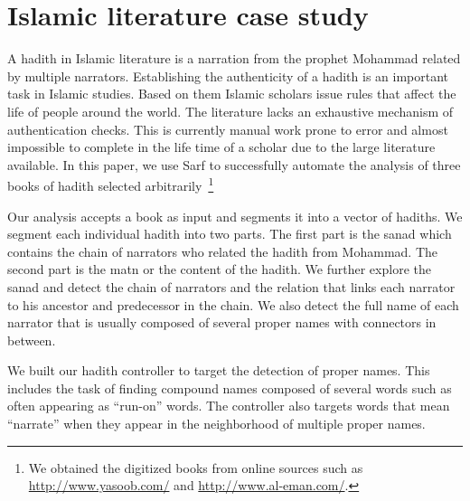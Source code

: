 \documentclass[11pt]{article}
\begin{document}
\section{Islamic literature case study}
\label{sec:islamic}

A hadith in Islamic literature is a narration from the prophet Mohammad
related by multiple narrators.
Establishing the authenticity of a hadith is an important task
in Islamic studies. 
Based on them Islamic scholars issue rules that affect the life
of people around the world. 
The literature lacks an exhaustive mechanism of authentication
checks. This is currently manual work prone to error and almost
impossible to complete in the life time of a scholar due to the
large literature available. 
In this paper, we use Sarf to successfully automate the
analysis of three books of hadith selected 
arbitrarily~\cite{IbnHanbal,AlKulayni,AlTousi}\footnote{We obtained
  the digitized books from online sources such as 
  \href{http://www.yasoob.com/}{http://www.yasoob.com/} and 
  \href{http://www.al-eman.com/}{http://www.al-eman.com/}. }



Our analysis accepts a book as input
and segments it into a vector of hadiths. 
We segment each individual hadith into two parts. 
The first part is the sanad which
contains the chain of narrators who related the hadith
from Mohammad. 
The second part is the matn or the content
of the hadith. 
We further explore the sanad and
detect the chain of narrators and 
the relation that links each narrator to his ancestor and 
predecessor in the chain. 
We also detect the full name of each narrator that is
usually composed of several proper names with connectors
in between. 

We built our hadith controller to target
the detection of proper names. 
This includes the task of finding compound names 
composed of several words such as  often
appearing as ``run-on'' words.
The controller also targets words that mean ``narrate'' when
they appear in the neighborhood of multiple proper names. 
\end{document}
